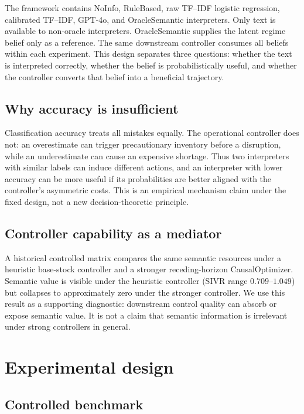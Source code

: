 \documentclass[10pt]{article}
\begin{document}
The framework contains NoInfo, RuleBased, raw TF--IDF logistic regression, calibrated TF--IDF, GPT-4o, and OracleSemantic interpreters. Only text is available to non-oracle interpreters. OracleSemantic supplies the latent regime belief only as a reference. The same downstream controller consumes all beliefs within each experiment. This design separates three questions: whether the text is interpreted correctly, whether the belief is probabilistically useful, and whether the controller converts that belief into a beneficial trajectory.

\subsection{Why accuracy is insufficient}

Classification accuracy treats all mistakes equally. The operational controller does not: an overestimate can trigger precautionary inventory before a disruption, while an underestimate can cause an expensive shortage. Thus two interpreters with similar labels can induce different actions, and an interpreter with lower accuracy can be more useful if its probabilities are better aligned with the controller's asymmetric costs. This is an empirical mechanism claim under the fixed design, not a new decision-theoretic principle.

\subsection{Controller capability as a mediator}

A historical controlled matrix compares the same semantic resources under a heuristic base-stock controller and a stronger receding-horizon CausalOptimizer. Semantic value is visible under the heuristic controller (SIVR range $0.709$--$1.049$) but collapses to approximately zero under the stronger controller. We use this result as a supporting diagnostic: downstream control quality can absorb or expose semantic value. It is not a claim that semantic information is irrelevant under strong controllers in general.

\section{Experimental design}

\subsection{Controlled benchmark}
\end{document}
